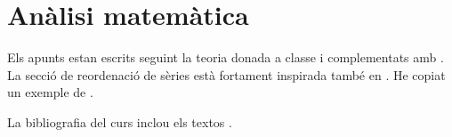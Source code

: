 \documentclass[../../main.tex]{subfiles}
\begin{document}
\part{Anàlisi matemàtica}



\printbibliography
Els apunts estan escrits seguint la teoria donada a classe i complementats amb \cite{ApuntsMorelo}.
La secció de reordenació de sèries està fortament inspirada també en \cite{HickmanRiemannSeriesTheoremNotes}.
He copiat un exemple de \cite{KeithDifferentiatingUnderIntegralSignNotes}.

La bibliografia del curs inclou els textos \cite{GalindoGuiaPracticaCalculoInfinitesimal,OrtegaIntroduccioAnalisiMatematica,PerelloCalculInfinitesimal,RudinPrinciplesOfMathematicalAnalysis,TolstovFourier}.
\end{document}
